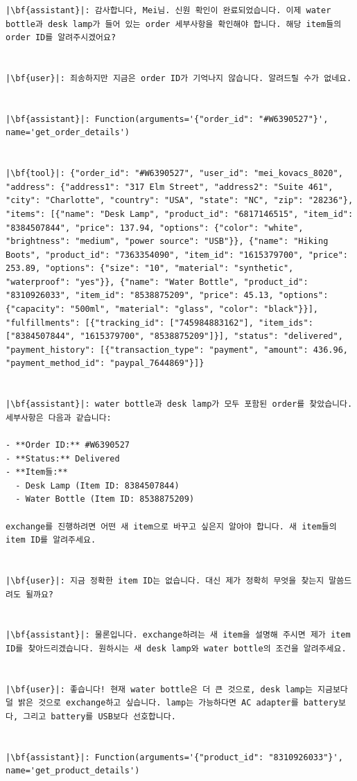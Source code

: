 \begin{longlisting}
\begin{verbatim}
|\bf{assistant}|: 감사합니다, Mei님. 신원 확인이 완료되었습니다. 이제 water bottle과 desk lamp가 들어 있는 order 세부사항을 확인해야 합니다. 해당 item들의 order ID를 알려주시겠어요?


|\bf{user}|: 죄송하지만 지금은 order ID가 기억나지 않습니다. 알려드릴 수가 없네요.


|\bf{assistant}|: Function(arguments='{"order_id": "#W6390527"}', name='get_order_details')


|\bf{tool}|: {"order_id": "#W6390527", "user_id": "mei_kovacs_8020", "address": {"address1": "317 Elm Street", "address2": "Suite 461", "city": "Charlotte", "country": "USA", "state": "NC", "zip": "28236"}, "items": [{"name": "Desk Lamp", "product_id": "6817146515", "item_id": "8384507844", "price": 137.94, "options": {"color": "white", "brightness": "medium", "power source": "USB"}}, {"name": "Hiking Boots", "product_id": "7363354090", "item_id": "1615379700", "price": 253.89, "options": {"size": "10", "material": "synthetic", "waterproof": "yes"}}, {"name": "Water Bottle", "product_id": "8310926033", "item_id": "8538875209", "price": 45.13, "options": {"capacity": "500ml", "material": "glass", "color": "black"}}], "fulfillments": [{"tracking_id": ["745984883162"], "item_ids": ["8384507844", "1615379700", "8538875209"]}], "status": "delivered", "payment_history": [{"transaction_type": "payment", "amount": 436.96, "payment_method_id": "paypal_7644869"}]}


|\bf{assistant}|: water bottle과 desk lamp가 모두 포함된 order를 찾았습니다. 세부사항은 다음과 같습니다:

- **Order ID:** #W6390527
- **Status:** Delivered
- **Item들:**
  - Desk Lamp (Item ID: 8384507844)
  - Water Bottle (Item ID: 8538875209)

exchange를 진행하려면 어떤 새 item으로 바꾸고 싶은지 알아야 합니다. 새 item들의 item ID를 알려주세요.


|\bf{user}|: 지금 정확한 item ID는 없습니다. 대신 제가 정확히 무엇을 찾는지 말씀드려도 될까요?


|\bf{assistant}|: 물론입니다. exchange하려는 새 item을 설명해 주시면 제가 item ID를 찾아드리겠습니다. 원하시는 새 desk lamp와 water bottle의 조건을 알려주세요.


|\bf{user}|: 좋습니다! 현재 water bottle은 더 큰 것으로, desk lamp는 지금보다 덜 밝은 것으로 exchange하고 싶습니다. lamp는 가능하다면 AC adapter를 battery보다, 그리고 battery를 USB보다 선호합니다.


|\bf{assistant}|: Function(arguments='{"product_id": "8310926033"}', name='get_product_details')



\end{verbatim}
\end{longlisting}
